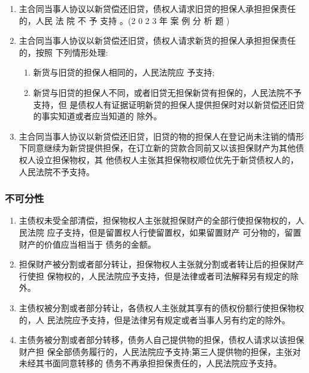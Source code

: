 \documentclass[UTF8,12pt]{ctexart}
\numberwithin{equation}{section} %
\numberwithin{figure}{section}
\numberwithin{table}{section}
\begin{document}
	\begin{enumerate}
		\item 主合同当事人协议以新贷偿还旧贷，债权人请求旧贷的担保人承担担保责任的，人民 法 院 不 予 支持 。(2 0 2 3 年 案 例 分 析 题 )
		
		\item 主合同当事人协议以新贷偿还旧贷，债权人请求新货的担保人承担担保责任的，按照 下列情形处理:
		\begin{enumerate}
			\item 新货与旧贷的担保人相同的，人民法院应 予支持;
			
			\item 新贷与旧贷的担保人不同，或者旧贷无担保新贷有担保的，人民法院不予支持，但 是债权人有证据证明新贷的担保人提供担保时对以新贷偿还旧贷的事实知道或者应当知道的 除外。
		\end{enumerate}
		
		\item 主合同当事人协议以新贷偿还旧贷，旧贷的物的担保人在登记尚未注销的情形下同意继续为新贷提供担保，在订立新的贷款合同前又以该担保财产为其他债权人设立担保物权，其 他债权人主张其担保物权顺位优先于新贷债权人的，人民法院不予支持。
	\end{enumerate}

	
	
	\subsubsection{不可分性}
	\begin{enumerate}
		\item 主债权未受全部清偿，担保物权人主张就担保财产的全部行使担保物权的，人民法院 应子支持，但是留置权人行使留置权，如果留置财产 可分物的，留置财产的价值应当相当于 债务的金额。
		
		\item 担保财产被分割或者部分转让，担保物权人主张就分割或者转让后的担保财产行使担 保物权的，人民法院应予支持，但是法律或者司法解释另有规定的除外。
		
		\item 主债权被分割或者部分转让，各债权人主张就其享有的债权份额行使担保物权的，人 民法院应予支持，但是法律另有规定或者当事人另有约定的除外。
		
		\item 主债务被分割或者部分转移，债务人自己提供物的担保，债权人请求以该担保财产担 保全部债务履行的，人民法院应予支持;第三人提供物的担保，主张对未经其书面同意转移的 债务不再承担担保责任的，人民法院应予支持。
	\end{enumerate}
	
\end{document}
